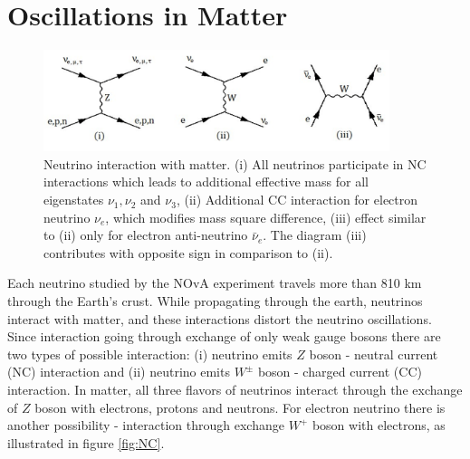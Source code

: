 \section{Oscillations in Matter}
\begin{figure}
\includegraphics[width=0.9\textwidth]{figures/NC_and_CC_currents.pdf}
\centering
\caption{Neutrino interaction with matter. (i) All neutrinos participate in NC interactions which 
leads to additional effective mass for all eigenstates $\nu_1, \nu_2$ and $\nu_3$, (ii) Additional 
CC interaction for electron neutrino $\nu_e$, which modifies mass square difference, (iii) effect 
similar to (ii) only for electron anti-neutrino $\bar{\nu}_e$. The diagram (iii) contributes with 
opposite sign in comparison to (ii).} 
\end{figure}

Each neutrino studied by the NOvA experiment travels more than 810 km through the Earth's crust.
While propagating through the earth, neutrinos interact with matter, and these interactions
distort the neutrino oscillations. Since interaction going through 
exchange of only weak gauge bosons there are two types of possible interaction: (i) neutrino 
emits $Z$ boson - neutral current (NC) interaction and (ii) neutrino emits $W^\pm$ boson - 
charged current (CC) interaction. In matter, all three flavors of neutrinos interact through 
the exchange of $Z$ boson with electrons, protons and neutrons. For electron neutrino there 
is another possibility - interaction through exchange $W^+$ boson with electrons, as illustrated  
in figure \ref{fig:NC}.

